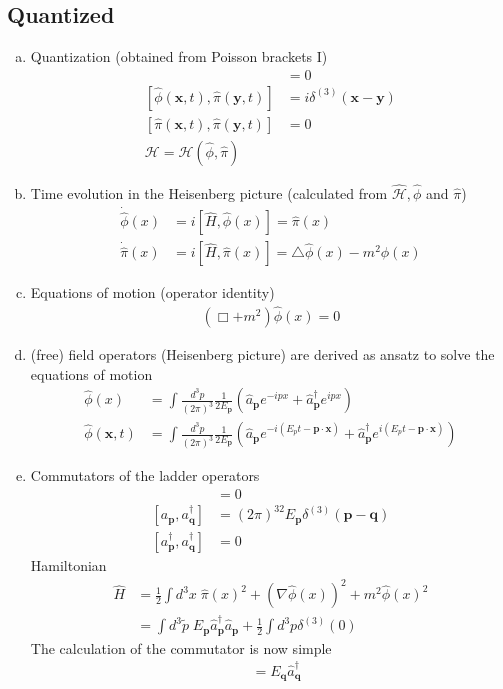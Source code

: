 \documentclass[10pt,a4paper]{report}
\theoremstyle{definition}
\begin{document}
\subsection{Quantized}
\begin{enumerate}[a)]
\item Quantization (obtained from Poisson brackets I)
\begin{align}
[\hat{\phi}(\mathbf{x},t),\hat{\phi}(\mathbf{y},t)]&=0\\
[\hat{\phi}(\mathbf{x},t),\hat{\pi}(\mathbf{y},t)]&=i\delta^{(3)}(\mathbf{x}-\mathbf{y})\\
[\hat{\pi}(\mathbf{x},t),\hat{\pi}(\mathbf{y},t)]&=0\\
\mathcal{H}=\mathcal{H}(\hat{\phi},\hat{\pi})
\end{align}
\item Time evolution in the Heisenberg picture (calculated from $\hat{\mathcal{H}}, \hat{\phi}$ and $\hat{\pi}$)
\begin{align}
\dot{\hat{\phi}}(x)&=i[\hat{H},\hat{\phi}(x)]=\hat{\pi}(x)\\
\dot{\hat{\pi}}(x)&=i[\hat{H},\hat{\pi}(x)]=\triangle\hat{\phi}(x)-m^2\hat{\phi}(x)
\end{align} 
\item Equations of motion (operator identity)
\begin{align}
(\Box+m^2)\hat{\phi}(x)=0
\end{align}
\item (free) field operators (Heisenberg picture) are derived as ansatz to solve the equations of motion
\begin{align}
\hat\phi(x)
&=\int \frac{d^3p}{(2\pi)^3}\frac{1}{2E_\mathbf{p}}
(\hat{a}_\mathbf{p}e^{-ipx}
+\hat{a}_\mathbf{p}^\dagger e^{ipx})\\
\hat\phi(\mathbf{x},t)
&=\int \frac{d^3p}{(2\pi)^3}\frac{1}{2E_\mathbf{p}}
(\hat{a}_\mathbf{p}e^{-i(E_pt-\mathbf{p\cdot x})}
+\hat{a}_\mathbf{p}^\dagger e^{i(E_pt-\mathbf{p\cdot x})})
\end{align}
\item Commutators of the ladder operators
\begin{align}
[a_\mathbf{p},a_\mathbf{q}]&=0\\
[a_\mathbf{p},a^\dagger_\mathbf{q}]&=(2\pi)^32E_\mathbf{p}\delta^{(3)}(\mathbf{p}-\mathbf{q})\\
[a^\dagger_\mathbf{p},a^\dagger_\mathbf{q}]&=0
\end{align}
Hamiltonian
\begin{align}
\hat{H}
&=\frac{1}{2}\int d^3x\;\hat\pi(x)^2+(\nabla\hat\phi(x))^2+m^2\hat\phi(x)^2\\
&=\int d^3\tilde{p}\;E_\mathbf{p}
\hat{a}^\dagger_\mathbf{p}\hat{a}_\mathbf{p}
+\frac{1}{2}\int d^3p\delta^{(3)}(0)
\end{align}
The calculation of the commutator is now simple
\begin{align}
[\hat{H},\hat{a}^\dagger_\mathbf{p}]&=E_\mathbf{q}\hat{a}^\dagger_\mathbf{q}
\end{align}


\end{enumerate}
\end{document}
